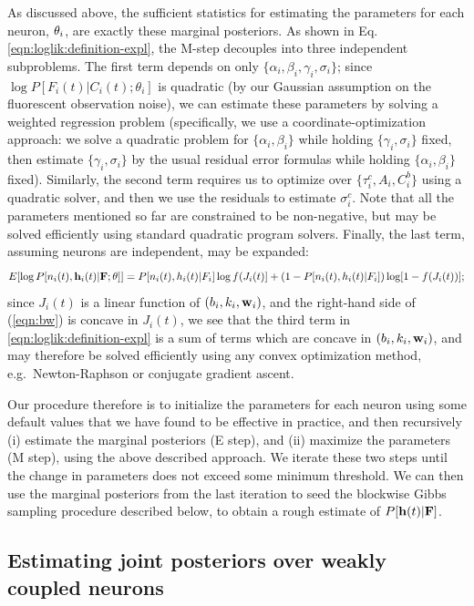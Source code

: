 As discussed above, the sufficient statistics for estimating the
parameters for each neuron, $\mathbf{\theta}_i$, are exactly these marginal
posteriors.  As shown in Eq. \ref{eqn:loglik:definition-expl}, the
M-step decouples into three independent subproblems.  The first term
depends on only $\{\alpha_i, \beta_i, \gamma_i, \sigma_i\}$; since
$\log P[F_i(t)|C_i(t); \theta_i]$ is quadratic (by our Gaussian
assumption on the fluorescent observation noise), we can estimate
these parameters by solving a weighted regression problem
(specifically, we use a coordinate-optimization approach: we solve a
quadratic problem for $\{\alpha_i, \beta_i\}$ while holding
$\{\gamma_i, \sigma_i\}$ fixed, then estimate $\{\gamma_i,\sigma_i\}$
by the usual residual error formulas while holding $\{\alpha_i,
\beta_i\}$ fixed).  Similarly, the second term requires us to optimize
over $\{\tau_i^c, A_i, C_i^b\}$ using a quadratic solver, and then we
use the residuals to estimate $\sigma_i^c$.  Note that all the
parameters mentioned so far are constrained to be non-negative, but
may be solved efficiently using standard quadratic program solvers.
Finally, the last term, assuming neurons are independent, may be
expanded:
\begin{equation} 
  E [\log P[n_i(t), \bh_i(t) | \bF; \bth]] = P[n_i(t), h_i(t) | F_i]
\log f (J_i(t)] + (1-P[n_i(t), h_i(t) | F_i]) \log [1- f(J_i(t))];
\label{eqn:bw}
\end{equation}
since $J_i(t)$ is a linear function of $(b_i,k_i,\mathbf{w}_i)$, and the
right-hand side of (\ref{eqn:bw}) is concave in $J_i(t)$, we see that
the third term in \ref{eqn:loglik:definition-expl} is a sum of terms
which are concave in $(b_i,k_i,\mathbf{w}_i)$, and may therefore be solved
efficiently using any convex optimization method, e.g.\ Newton-Raphson
or conjugate gradient ascent.

Our procedure therefore is to initialize the parameters for each
neuron using some default values that we have found to be effective in
practice, and then recursively (i) estimate the marginal posteriors (E
step), and (ii) maximize the parameters (M step), using the above
described approach.  We iterate these two steps until the change in
parameters does not exceed some minimum threshold.  We can then use
the marginal posteriors from the last iteration to seed the blockwise
Gibbs sampling procedure described below, to obtain a rough estimate
of $P[\mathbf{h}(t) | {\bf F}]$.

\subsection{Estimating joint posteriors over weakly coupled neurons}
\label{sec:methods:joint}

